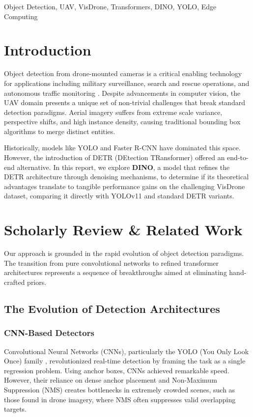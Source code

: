 \documentclass[11pt, conference, onecolumn]{IEEEtran}
\begin{document}
\begin{IEEEkeywords}
Object Detection, UAV, VisDrone, Transformers, DINO, YOLO, Edge Computing
\end{IEEEkeywords}

\section{Introduction}
Object detection from drone-mounted cameras is a critical enabling technology for applications including military surveillance, search and rescue operations, and autonomous traffic monitoring \cite{visdrone}. Despite advancements in computer vision, the UAV domain presents a unique set of non-trivial challenges that break standard detection paradigms. Aerial imagery suffers from extreme scale variance, perspective shifts, and high instance density, causing traditional bounding box algorithms to merge distinct entities.

Historically, models like YOLO and Faster R-CNN have dominated this space. However, the introduction of DETR (DEtection TRansformer) offered an end-to-end alternative. In this report, we explore \textbf{DINO}, a model that refines the DETR architecture through denoising mechanisms, to determine if its theoretical advantages translate to tangible performance gains on the challenging VisDrone dataset, comparing it directly with YOLOv11 and standard DETR variants.

\section{Scholarly Review \& Related Work}
Our approach is grounded in the rapid evolution of object detection paradigms. The transition from pure convolutional networks to refined transformer architectures represents a sequence of breakthroughs aimed at eliminating hand-crafted priors.

\subsection{The Evolution of Detection Architectures}

\subsubsection{CNN-Based Detectors}
Convolutional Neural Networks (CNNs), particularly the YOLO (You Only Look Once) family \cite{yolo_orig}, revolutionized real-time detection by framing the task as a single regression problem. Using anchor boxes, CNNs achieved remarkable speed. However, their reliance on dense anchor placement and Non-Maximum Suppression (NMS) creates bottlenecks in extremely crowded scenes, such as those found in drone imagery, where NMS often suppresses valid overlapping targets.
\end{document}
